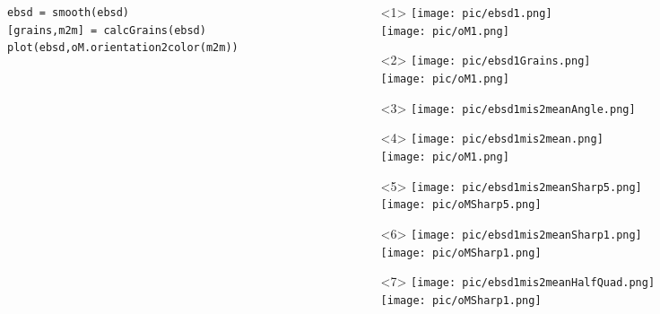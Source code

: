 \documentclass[comptress]{beamer}
\begin{document}
\begin{frame}[fragile]
\begin{columns}
\begin{column}{8.3cm}
\begin{overlayarea}{\textwidth}{\textheight}
       \pause
      \begin{lstlisting}[style=input]
ebsd = smooth(ebsd)
[grains,m2m] = calcGrains(ebsd)
plot(ebsd,oM.orientation2color(m2m))
\end{lstlisting}
\end{overlayarea}
\end{column}
    \begin{column}{3.8cm}
\vspace{-0.4cm}
      \begin{onlyenv}<1>
        \texttt{[image: pic/ebsd1.png]}\\
        \texttt{[image: pic/oM1.png]}
      \end{onlyenv}
      \begin{onlyenv}<2>
        \texttt{[image: pic/ebsd1Grains.png]}\\
        \texttt{[image: pic/oM1.png]}
      \end{onlyenv}
      \begin{onlyenv}<3>
        \texttt{[image: pic/ebsd1mis2meanAngle.png]}\\
      \end{onlyenv}
      \begin{onlyenv}<4>
        \texttt{[image: pic/ebsd1mis2mean.png]}\\
        \texttt{[image: pic/oM1.png]}
      \end{onlyenv}
      \begin{onlyenv}<5>
        \texttt{[image: pic/ebsd1mis2meanSharp5.png]}\\
        \texttt{[image: pic/oMSharp5.png]}
      \end{onlyenv}
      \begin{onlyenv}<6>
        \texttt{[image: pic/ebsd1mis2meanSharp1.png]}\\
        \texttt{[image: pic/oMSharp1.png]}
      \end{onlyenv}
      \begin{onlyenv}<7>
        \texttt{[image: pic/ebsd1mis2meanHalfQuad.png]}\\
        \texttt{[image: pic/oMSharp1.png]}
      \end{onlyenv}
    \end{column}
  \end{columns}

\end{frame}
\end{document}
